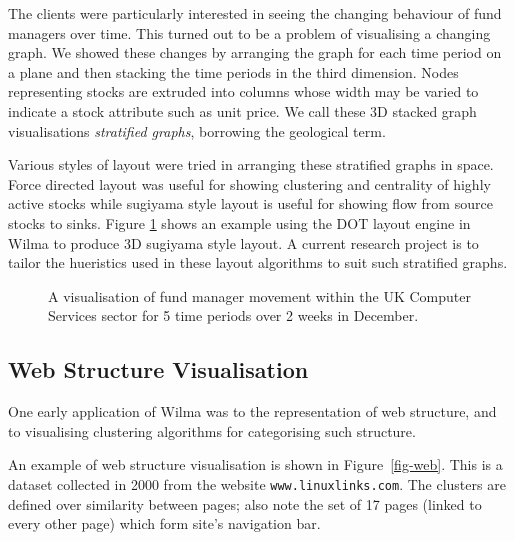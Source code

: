 \documentclass[runningheads]{cl2emult}
\newcommand{\url}[1]{{\small{\tt #1}}}
\begin{document}
The clients were particularly interested in seeing the changing
behaviour of fund managers over time.  This turned out to be a problem
of visualising a changing graph.  We showed these changes by
arranging the graph for each time period on a plane and then stacking
the time periods in the third dimension.  Nodes representing stocks
are extruded into columns whose width may be varied to indicate a
stock attribute such as unit price.  We call these 3D stacked graph
visualisations {\em stratified graphs}, borrowing the geological term.

Various styles of layout were tried in arranging these stratified
graphs in space.  Force
directed layout was useful for showing clustering and centrality of
highly active stocks while sugiyama style layout is useful for showing
flow from source stocks to sinks.  Figure \ref{fig-fm} shows an
example using the DOT layout engine in Wilma to produce 3D sugiyama
style layout.  A current research project is to tailor the hueristics
used in these layout algorithms to suit such stratified graphs.

\begin{figure}[h]
  \centering
  \caption{A visualisation of fund manager movement within the UK
  Computer Services sector for 5 time periods over 2 weeks in December.}
  \label{fig-fm}
\end{figure}

\subsection{Web Structure Visualisation}

One early application of Wilma was to the representation of web structure, and
to visualising clustering algorithms for categorising such
structure\cite{eckersley2kclassiscope}.

An example of web structure visualisation is shown in Figure~\ref{fig-web}.
This is a dataset collected in 2000 from the website \url{www.linuxlinks.com}.
The clusters are defined over similarity between pages; also note the set of
17 pages (linked to every other page) which form site's navigation bar.
\end{document}
